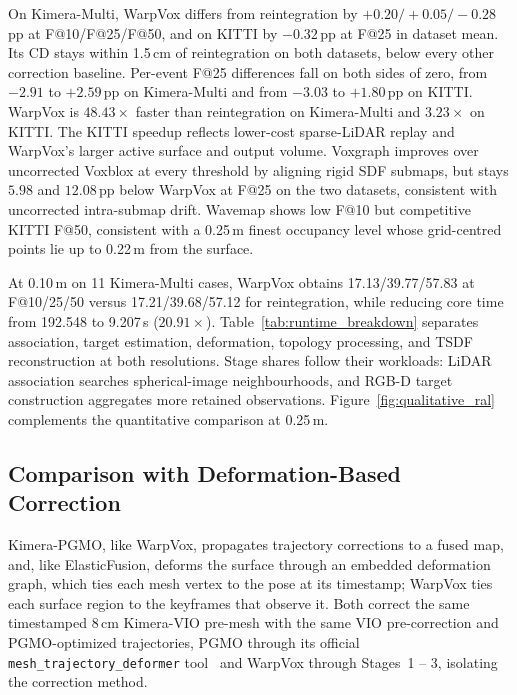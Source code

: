 On Kimera-Multi, WarpVox differs from reintegration by
$+0.20/+0.05/-0.28$\,pp at F@10/F@25/F@50, and on KITTI by $-0.32$\,pp at
F@25 in dataset mean. Its CD stays within 1.5\,cm of reintegration on both
datasets, below every other correction baseline. Per-event F@25 differences fall on both sides of zero, from $-2.91$ to $+2.59$\,pp on Kimera-Multi and from $-3.03$ to
$+1.80$\,pp on KITTI. WarpVox is $48.43\times$ faster
than reintegration on Kimera-Multi and $3.23\times$ on KITTI. The KITTI speedup reflects lower-cost sparse-LiDAR replay and WarpVox's
larger active surface and output volume. Voxgraph improves over uncorrected
Voxblox at every threshold by aligning rigid SDF submaps, but stays $5.98$
and $12.08$\,pp below WarpVox at F@25 on the two datasets, consistent with
uncorrected intra-submap drift. Wavemap shows low F@10 but competitive KITTI
F@50, consistent with a 0.25\,m finest occupancy level whose grid-centred
points lie up to 0.22\,m from the surface.

At 0.10\,m on 11 Kimera-Multi cases, WarpVox obtains 17.13/39.77/57.83 at
F@10/25/50 versus 17.21/39.68/57.12 for reintegration, while reducing core
time from 192.548 to 9.207\,s ($20.91\times$).
Table~\ref{tab:runtime_breakdown} separates association, target estimation,
deformation, topology processing, and TSDF reconstruction at both
resolutions.
Stage shares follow their workloads: LiDAR association searches
spherical-image neighbourhoods, and RGB-D target construction aggregates more
retained observations. Figure~\ref{fig:qualitative_ral} complements the quantitative
comparison at 0.25\,m.

\subsection{Comparison with Deformation-Based Correction}
\label{sec:pgmo}

Kimera-PGMO, like WarpVox, propagates trajectory corrections to a fused map,
and, like ElasticFusion, deforms the surface through an embedded deformation
graph, which ties each mesh vertex to the pose at its timestamp; WarpVox ties
each surface region to the keyframes that observe it. Both correct the same
timestamped $8\,\mathrm{cm}$ Kimera-VIO pre-mesh with the same VIO
pre-correction and PGMO-optimized trajectories, PGMO through its official
\texttt{mesh\_trajectory\_deformer} tool~\cite{kimera_pgmo} and WarpVox
through Stages~1 -- 3, isolating the correction method.

